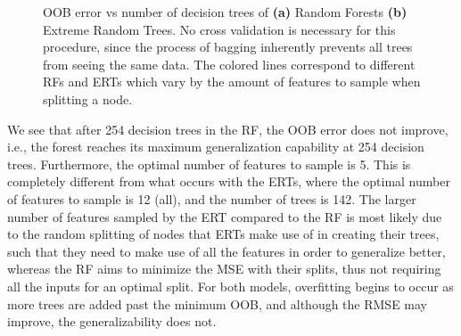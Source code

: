 \documentclass[a4paper, twoside, final, 12pt]{article}
\begin{document}
{\begin{figure}[h!]
\begin{subfigure}{0.5\linewidth}
				\caption{}
		\label{subfig:ERT_oob}
	\end{subfigure}
	\caption{OOB error vs number of decision trees of \textbf{(a)} Random Forests \textbf{(b)} Extreme Random Trees. No cross validation is necessary for this procedure, since the process of bagging inherently prevents all trees from seeing the same data. The colored lines correspond to different RFs and ERTs which vary by the amount of features to sample when splitting a node.}
	\label{fig:RF_exp}
\end{figure}

We see that after 254 decision trees in the RF, the OOB error does not improve, i.e., the forest reaches its maximum generalization capability at 254 decision trees. Furthermore, the optimal number of features to sample is 5. This is completely different from what occurs with the ERTs, where the optimal number of features to sample is 12 (all), and the number of trees is 142. The larger number of features sampled by the ERT compared to the RF is most likely due to the random splitting of nodes that ERTs make use of in creating their trees, such that they need to make use of all the features in order to generalize better, whereas the RF aims to minimize the MSE with their splits, thus not requiring all the inputs for an optimal split. For both models, overfitting begins to occur as more trees are added past the minimum OOB, and although the RMSE may improve, the generalizability does not.


}
\end{document}
